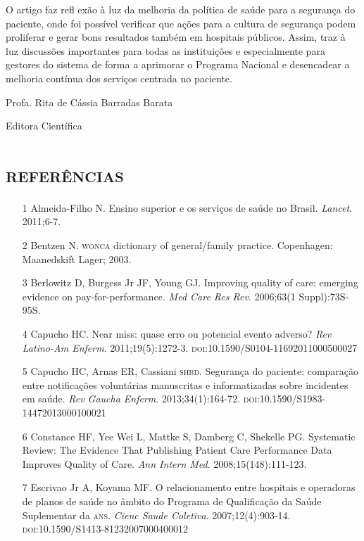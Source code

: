 \documentclass{article}
\begin{document}
O artigo faz refl exão à luz da melhoria da política de saúde para a segurança
do paciente,
onde foi possível verificar que ações para a cultura de segurança podem
proliferar e gerar
bons resultados também em hospitais públicos. Assim, traz à luz discussões
importantes para
todas as instituições e especialmente para gestores do sistema de forma a
aprimorar o
Programa Nacional e desencadear a melhoria contínua dos serviços centrada no
paciente.

Profa. Rita de Cássia Barradas Barata

Editora Científica

\section*{\textsc{referências}}
\begin{itemize}

\item[1] Almeida-Filho N. Ensino superior e os serviços de saúde no Brasil.
\textit{Lancet}. 2011;6-7.

\item[2] Bentzen N. \textsc{wonca} dictionary of general/family practice. Copenhagen:
Maanedskift Lager; 2003.

\item[3] Berlowitz D, Burgess Jr JF, Young GJ. Improving quality of care:
emerging
evidence on pay-for-performance. \textit{Med Care Res Rev}. 2006;63(1
Suppl):73S-95S.

\item[4] Capucho HC. Near miss: quase erro ou potencial evento adverso?
\textit{Rev
Latino-Am Enferm}. 2011;19(5):1272-3.
\textsc{doi}:10.1590/S0104-11692011000500027

\item[5] Capucho HC, Arnas ER, Cassiani \textsc{shbd}. Segurança do paciente:
comparação
entre notificações voluntárias manuscritas e informatizadas sobre incidentes em
saúde.
\textit{Rev Gaucha Enferm}. 2013;34(1):164-72.
\textsc{doi}:10.1590/S1983-14472013000100021

\item[6] Constance HF, Yee Wei L, Mattke S, Damberg C, Shekelle PG. Systematic
Review: The Evidence That Publishing Patient Care Performance Data Improves
Quality of
Care. \textit{Ann Intern Med}. 2008;15(148):111-123.

\item[7] Escrivao Jr A, Koyama MF. O relacionamento entre hospitais e
operadoras de
planos de saúde no âmbito do Programa de Qualificação da Saúde Suplementar da
\textsc{ans}.
\textit{Cienc Saude Coletiva}. 2007;12(4):903-14.
\textsc{doi}:10.1590/S1413-81232007000400012


\end{itemize}
\end{document}
